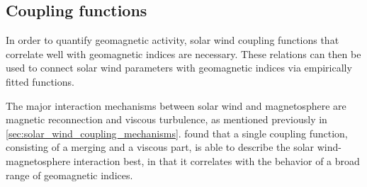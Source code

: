 \subsection{Coupling functions}
\label{sec:coupling_functions}
In order to quantify geomagnetic activity, solar wind coupling functions that correlate well with geomagnetic indices are necessary. These relations can then be used to connect solar wind parameters with geomagnetic indices via empirically fitted functions.

The major interaction mechanisms between solar wind and magnetosphere are magnetic reconnection and viscous turbulence, as mentioned previously in \autoref{sec:solar_wind_coupling_mechanisms}. \citet{Newell2008} found that a single coupling function, consisting of a merging and a viscous part, is able to describe the solar wind-magnetosphere interaction best, in that it correlates with the behavior of a broad range of geomagnetic indices.


